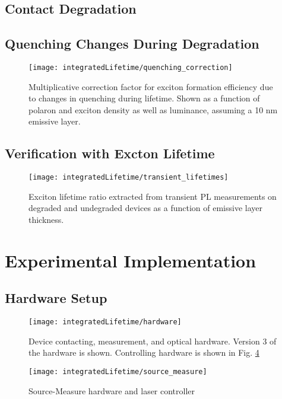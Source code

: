 \documentclass[../thesis.tex]{subfiles}
\begin{document}
\subsection{Contact Degradation}
\subsection{Quenching Changes During Degradation}
\begin{figure}[ht]
\centering
\texttt{[image: integratedLifetime/quenching\_correction]}
\caption{Multiplicative correction factor for exciton formation efficiency due to changes in quenching during lifetime.  Shown as a function of polaron and exciton density as well as luminance, assuming a 10 nm emissive layer.}
\label{fig:quenching_correction}
\end{figure}
\subsection{Verification with Excton Lifetime}
\begin{figure}[ht]
\centering
\texttt{[image: integratedLifetime/transient\_lifetimes]}
\caption{Exciton lifetime ratio extracted from transient PL measurements on degraded and undegraded devices as a function of emissive layer thickness.}
\label{fig:transient_lifetimes}
\end{figure}

\section{Experimental Implementation}
\subsection{Hardware Setup}
\begin{figure}[ht]
\centering
\texttt{[image: integratedLifetime/hardware]}
\caption{Device contacting, measurement, and optical hardware.  Version 3 of the hardware is shown.  Controlling hardware is shown in Fig. \ref{fig:source_measure}}
\label{fig:hardware}
\end{figure}

\begin{figure}[ht]
\centering
\texttt{[image: integratedLifetime/source\_measure]}
\caption{Source-Measure hardware and laser controller}
\label{fig:source_measure}
\end{figure}
\end{document}

